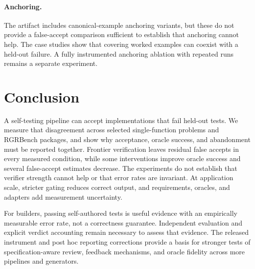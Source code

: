 \paragraph{Anchoring.} The artifact includes canonical-example anchoring variants, but these do
not provide a false-accept comparison sufficient to establish that anchoring cannot help. The
case studies show that covering worked examples can coexist with a held-out failure. A fully
instrumented anchoring ablation with repeated runs remains a separate experiment.

\section{Conclusion}
\label{sec:conclusion}

A self-testing pipeline can accept implementations that fail held-out tests. We measure
that disagreement across selected single-function problems and RGRBench packages, and show
why acceptance, oracle success, and abandonment must be reported together. Frontier
verification leaves residual false accepts in every measured condition, while some
interventions improve oracle success and several false-accept estimates decrease. The
experiments do not establish that verifier strength cannot help or that error rates are
invariant. At application scale, stricter gating reduces correct output, and requirements,
oracles, and adapters add measurement uncertainty.

For builders, passing self-authored tests is useful evidence with an empirically measurable
error rate, not a correctness guarantee. Independent evaluation and explicit verdict
accounting remain necessary to assess that evidence. The released instrument and post hoc
reporting corrections provide a basis for stronger tests of specification-aware review,
feedback mechanisms, and oracle fidelity across more pipelines and generators.

